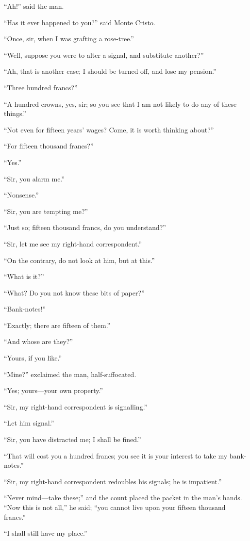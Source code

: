 “Ah!” said the man.

“Has it ever happened to you?” said Monte Cristo.

“Once, sir, when I was grafting a rose-tree.”

“Well, suppose you were to alter a signal, and substitute another?”

“Ah, that is another case; I should be turned off, and lose my
pension.”

“Three hundred francs?”

“A hundred crowns, yes, sir; so you see that I am not likely to do any
of these things.”

“Not even for fifteen years’ wages? Come, it is worth thinking about?”

“For fifteen thousand francs?”

“Yes.”

“Sir, you alarm me.”

“Nonsense.”

“Sir, you are tempting me?”

“Just so; fifteen thousand francs, do you understand?”

“Sir, let me see my right-hand correspondent.”

“On the contrary, do not look at him, but at this.”

“What is it?”

“What? Do you not know these bits of paper?”

“Bank-notes!”

“Exactly; there are fifteen of them.”

“And whose are they?”

“Yours, if you like.”

“Mine?” exclaimed the man, half-suffocated.

“Yes; yours—your own property.”

“Sir, my right-hand correspondent is signalling.”

“Let him signal.”

“Sir, you have distracted me; I shall be fined.”

“That will cost you a hundred francs; you see it is your interest to
take my bank-notes.”

“Sir, my right-hand correspondent redoubles his signals; he is
impatient.”

“Never mind—take these;” and the count placed the packet in the man’s
hands. “Now this is not all,” he said; “you cannot live upon your
fifteen thousand francs.”

“I shall still have my place.”

